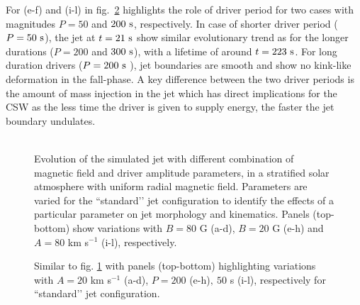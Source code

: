 \documentclass[12pt]{ociamthesis}
\newcommand{\fref}[1]{fig. \ref{#1}}
\newcommand{\np}{\\ \\}
\begin{document}
For (e-f) and (i-l) in fig.~\ref{paramter_scan_two} highlights the role of driver period for two cases with magnitudes $P = 50$ and $200~\rm{s}$, respectively. In case of shorter driver period ($P = 50 ~\rm{s}$), the jet at $t = 21~\rm{s}$ show similar evolutionary trend as for the longer durations ($P = 200$ and $300~\rm{s}$), with a lifetime of around $t = 223~\rm{s}$. For long duration drivers ($P = 200~\rm{s}$ ), jet boundaries are smooth and show no kink-like deformation in the fall-phase. A key difference between the two driver periods is the amount of mass injection in the jet which has direct implications for the CSW as the less time the driver is given to supply energy, the faster the jet boundary undulates. \np
\begin{figure}
\captionsetup[subfigure]{labelformat=empty}
\centering
{} 
\caption{Evolution of the simulated jet with different combination of magnetic field and driver amplitude parameters, in a stratified solar atmosphere with uniform radial magnetic field. Parameters are varied for the ``standard’’ jet configuration to identify the effects of a particular parameter on jet morphology and kinematics. Panels (top-bottom) show variations with $B = 80$ G (a-d), $B = 20$ G  (e-h) and $A = 80$ km s$^{-1}$ (i-l), respectively.}
\label{paramter_scan_one}
\end{figure}
\begin{figure}
\captionsetup[subfigure]{labelformat=empty}
\centering
{} 
\caption{Similar to \fref{paramter_scan_one} with panels (top-bottom) highlighting variations with $A = 20$ km s$^{-1}$ (a-d), $P = 200$ (e-h)$,~50$ s (i-l), respectively for ``standard’’ jet configuration.}
\label{paramter_scan_two}
\end{figure}
\end{document}
